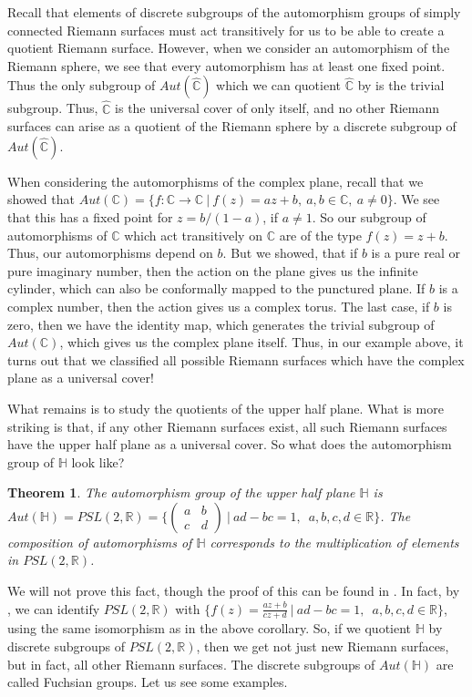 \documentclass[11pt]{report}
\newtheorem{thm}{Theorem}[section]
\theoremstyle{definition}
\begin{document}
Recall that elements of discrete subgroups of the automorphism groups of simply connected Riemann surfaces must act transitively for us to be able to create a quotient Riemann surface. However, when we consider an automorphism of the Riemann sphere, we see that every automorphism has at least one fixed point. Thus the only subgroup of $Aut(\widehat{\mathbb{C}})$ which we can quotient $\widehat{\mathbb{C}}$ by is the trivial subgroup. Thus, $\widehat{\mathbb{C}}$ is the universal cover of only itself, and no other Riemann surfaces can arise as a quotient of the Riemann sphere by a discrete subgroup of $Aut(\widehat{\mathbb{C}})$.

When considering the automorphisms of the complex plane, recall that we showed that $Aut(\mathbb{C})= \{f:\mathbb{C}\rightarrow \mathbb{C} \ \vert \ f(z) = az + b, \ a,b\in\mathbb{C}, \ a \neq 0\}$. We see that this has a fixed point for $z = b/(1-a)$, if $a \neq 1$. So our subgroup of automorphisms of $\mathbb{C}$ which act transitively on $\mathbb{C}$ are of the type $f(z) = z + b$. Thus, our automorphisms depend on $b$. But we showed, that if $b$ is a pure real or pure imaginary number, then the action on the plane gives us the infinite cylinder, which can also be conformally mapped to the punctured plane. If $b$ is a complex number, then the action gives us a complex torus. The last case, if $b$ is zero, then we have the identity map, which generates the trivial subgroup of $Aut(\mathbb{C})$, which gives us the complex plane itself. Thus, in our example above, it turns out that we classified all possible Riemann surfaces which have the complex plane as a universal cover!

What remains is to study the quotients of the upper half plane. What is more striking is that, if any other Riemann surfaces exist, all such Riemann surfaces have the upper half plane as a universal cover. So what does the automorphism group of $\mathbb{H}$ look like?
\begin{thm}
  The automorphism group of the upper half plane $\mathbb{H}$ is ~\\ $Aut(\mathbb{H})=PSL(2,\mathbb{R}) = \Bigg\{ \begin{pmatrix} a & b\\ c & d \end{pmatrix} \ \Bigg\vert \ ad-bc = 1, \enspace a, b, c ,d \in \mathbb{\mathbb{R}}\Bigg\}$. The composition of automorphisms of $\mathbb{H}$ corresponds to the multiplication of elements in $PSL(2,\mathbb{R})$.
\end{thm} 
We will not prove this fact, though the proof of this can be found in \cite[Theorem 4.17.3 (iii)]{comfun}. In fact, by \cite[Theorem 2.9.1]{comfun}, we can identify $PSL(2,\mathbb{R})$ with $\bigl\{f(z) = \frac{az+b}{cz+d}\ \vert \ ad-bc = 1, \enspace a, b, c ,d \in \mathbb{R}\bigr\}$, using the same isomorphism as in the above corollary. So, if we quotient $\mathbb{H}$ by discrete subgroups of $PSL(2,\mathbb{R})$, then we get not just new Riemann surfaces, but in fact, all other Riemann surfaces. The discrete subgroups of $Aut(\mathbb{H})$ are called Fuchsian groups. Let us see some examples.
\end{document}
